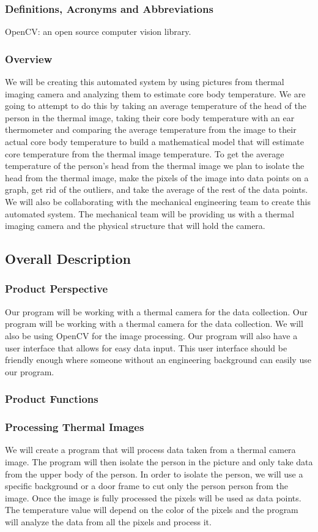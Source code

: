 	\subsubsection*{Definitions, Acronyms and Abbreviations}
	OpenCV: an open source computer vision library.
	
	\subsubsection*{Overview}
	We will be creating this automated system by using pictures from thermal imaging camera and analyzing them to estimate core body temperature. We are going to attempt to do this by taking an average temperature of the head of the person in the thermal image, taking their core body temperature with an ear thermometer and comparing the average temperature from the image to their actual core body temperature to build a mathematical model that will estimate core temperature from the thermal image temperature. To get the average temperature of the person’s head from the thermal image we plan to isolate the head from the thermal image, make the pixels of the image into data points on a graph, get rid of the outliers, and take the average of the rest of the data points. We will also be collaborating with the mechanical engineering team to create this automated system. The mechanical team will be providing us with a thermal imaging camera and the physical structure that will hold the camera.
\subsection*{Overall Description}
	\subsubsection*{Product Perspective}
	Our program will be working with a thermal camera for the data collection. Our program will be working with a thermal camera for the data collection. We will also be using OpenCV for the image processing. Our program will also have a user interface that allows for easy data input. This user interface should be friendly enough where someone without an engineering background can easily use our program. 
	\subsubsection*{Product Functions}
	\subsubsection*{Processing Thermal Images}
	We will create a program that will process data taken from a thermal camera image. The program will then isolate the person in the picture and only take data from the upper body of the person. In order to isolate the person, we will use a specific background or a door frame to cut only the person person from the image. Once the image is fully processed the pixels will be used as data points. The temperature value will depend on the color of the pixels and the program will analyze the data from all the pixels and process it. 
